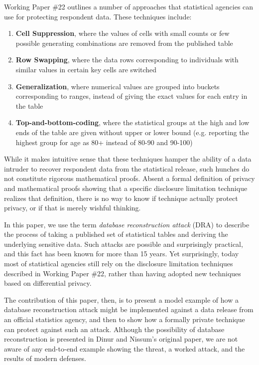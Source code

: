 \documentclass[runningheads]{llncs}
\begin{document}
Working Paper \#22 outlines a number of approaches that statistical
agencies can use for protecting respondent data. These techniques include:
\begin{enumerate}
  \item \textbf{Cell Suppression}, where the values of cells with small counts or few possible
        generating combinations are removed from the published table
  \item \textbf{Row Swapping}, where the data rows corresponding to individuals
        with similar values in certain key cells are switched
  \item \textbf{Generalization}, where numerical values are grouped into
        buckets corresponding to ranges, instead of giving the exact
        values for each entry in the table
  \item \textbf{Top-and-bottom-coding}, where the statistical groups at the high and low ends
        of the table are given without upper or lower bound (e.g.
        reporting the highest group for age as 80+ instead of
        80-90 and 90-100)
\end{enumerate}

While it makes intuitive sense that these techniques hamper the
ability of a  data intruder\cite{data-intruder} to recover respondent data from the
statistical release, such hunches do not constitute rigorous
mathematical proofs. Absent a formal definition of privacy and
mathematical proofs showing that a specific disclosure limitation
technique realizes that definition, there is no way to know if 
technique actually protect privacy, or if that is merely wishful thinking.

In this paper, we use
the term \emph{database reconstruction attack} (DRA) to describe the process of
taking a published set of statistical tables and deriving the
underlying sensitive data. Such attacks are possible and surprisingly
practical, and this fact has been known for more than 15
years\cite{noise}. Yet surprisingly, today most of
statistical agencies still rely on the disclosure
limitation techniques described in Working Paper \#22, rather than
having adopted new techniques based on differential
privacy\cite{Dwork:2006:CNS:2180286.2180305}. 

The contribution of this paper, then, is to present a model example of how
a database reconstruction attack might be implemented against a data
release from an official statistics agency, and then to show how a
formally private technique can protect against such an
attack. Although the possibility of database reconstruction is
presented in Dinur and Nissum's original paper\cite{noise}, we are not
aware of any end-to-end example showing the threat, a worked attack,
and the results of modern defenses. 
\end{document}
